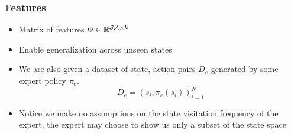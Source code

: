 \documentclass{beamer}
\begin{document}
%


\begin{frame}
	\frametitle{Features}
	\begin{itemize}
		\item Matrix of features $\Phi \in \mathbb{R}^{\mathcal{S}\mathcal{A} \times k}$
		\item Enable generalization across unseen states
		\item We are also given a dataset of state, action pairs $D_e$ generated by some expert policy $\pi_e$. \[ D_e = (s_i, \pi_e(s_i))_{i=1}^N \]
		\item Notice we make no assumptions on the state visitation frequency of the expert,
			the expert may choose to show us only a subset of the state space
	\end{itemize}
\end{frame}
\end{document}
